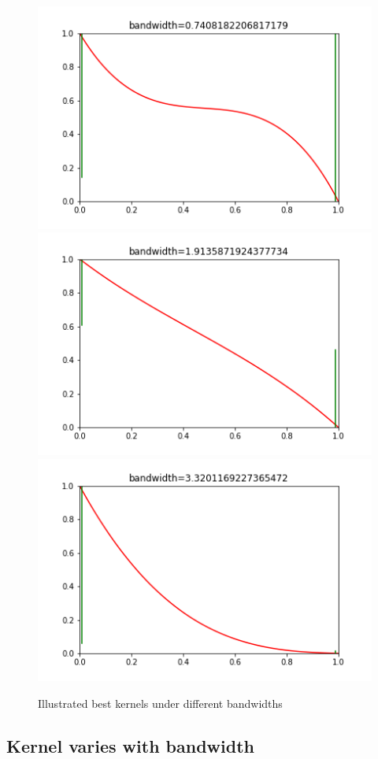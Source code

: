 \documentclass[a4 paper,12pt]{article}
\begin{document}
\begin{figure}
   \centering
   \includegraphics[scale=0.8]{case30_frame0000000.png}
   \includegraphics[scale=0.8]{case30_frame0000031.png}
   \includegraphics[scale=0.8]{case30_frame0000049.png}
   \caption{Illustrated best kernels under different bandwidths}
   \label{fig:kernels}
\end{figure}
\subsection*{Kernel varies with bandwidth}
\end{document}
